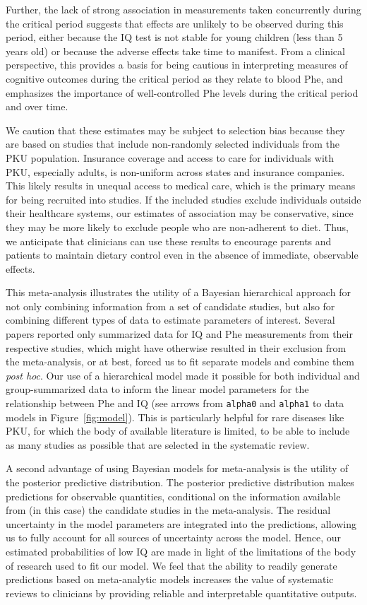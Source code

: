 \documentclass{svjour3}                     %
\begin{document}
Further, the lack of strong association in measurements taken concurrently during the critical period suggests that effects are unlikely to be observed during this period, either because the IQ test is not stable for young children (less than 5 years old) or because the adverse effects take time to manifest. From a clinical perspective, this provides a basis for being cautious in interpreting measures of cognitive outcomes during the critical period as they relate to blood Phe, and emphasizes the importance of well-controlled Phe levels during the critical period and over time.

We caution that these estimates may be subject to selection bias because they are based on studies that include non-randomly selected individuals from the PKU population. Insurance coverage and access to care for individuals with PKU, especially adults, is non-uniform across states and insurance companies. This likely results in unequal access to medical care, which is the primary means for being recruited into studies. If the included studies exclude individuals outside their healthcare systems, our estimates of association may be conservative, since they may be more likely to exclude people who are non-adherent to diet. Thus, we anticipate that clinicians can use these results to encourage parents and patients to maintain dietary control even in the absence of immediate, observable effects.

This meta-analysis illustrates the utility of a Bayesian hierarchical approach for not only combining information from a set of candidate studies, but also for combining different types of data to estimate parameters of interest. Several papers reported only summarized data for IQ and Phe measurements from their respective studies, which might have otherwise resulted in their exclusion from the meta-analysis, or at best, forced us to fit separate models and combine them \emph{post hoc}. Our use of a hierarchical model made it possible for both individual and group-summarized data to inform the linear model parameters for the relationship between Phe and IQ (see arrows from \verb|alpha0| and \verb|alpha1| to data models in Figure~\ref{fig:model}). This is particularly helpful for rare diseases like PKU, for which the body of available literature is limited, to be able to include as many studies as possible that are selected in the systematic review.

A second advantage of using Bayesian models for meta-analysis is the utility of the posterior predictive distribution. The posterior predictive distribution makes predictions for observable quantities, conditional on the information available from (in this case) the candidate studies in the meta-analysis. The residual uncertainty in the model parameters are integrated into the predictions, allowing us to fully account for all sources of uncertainty across the model. Hence, our estimated probabilities of low IQ are made in light of the limitations of the body of research used to fit our model. We feel that the ability to readily generate predictions based on meta-analytic models increases the value of systematic reviews to clinicians by providing reliable and interpretable quantitative outputs.
\end{document}
